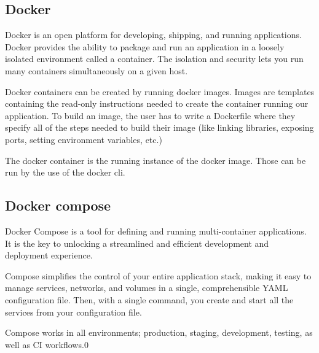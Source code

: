 	\subsection{Docker}
	Docker is an open platform for developing, shipping, and running applications. \cite{docker}
	Docker provides the ability to package and run an application in a loosely isolated environment 
	called a container. The isolation and security lets you run many containers simultaneously 
	on a given host.

	Docker containers can be created by running docker images. Images are templates 
	containing the read-only instructions needed 
	to create the container running our application. To build an image, the user has to write a Dockerfile
	where they specify all of the steps needed to build their image (like linking libraries, exposing ports, 
	setting environment variables, etc.)

	The docker container is the running instance of the docker image. Those can be run by the use of the docker cli.


	\subsection{Docker compose}
	Docker Compose \cite{dockercompose} is a tool for defining and running multi-container applications. It is the key to unlocking a streamlined and efficient development and deployment experience.

	Compose simplifies the control of your entire application stack, making it easy to manage services, networks, and volumes in a single, comprehensible YAML configuration file. Then, with a single command, you create and start all the services from your configuration file.

	Compose works in all environments; production, staging, development, testing, as well as CI workflows.0

